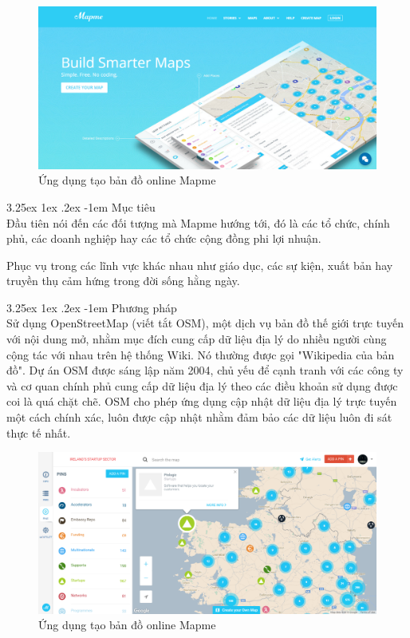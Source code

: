 \documentclass[12pt,a4paper]{article}
\makeatletter
\newcommand{\myparagraph}[1]{\paragraph{#1}\mbox{}\\} %
\renewcommand\paragraph{\@startsection{paragraph}{5}{\z@}%
  {3.25ex \@plus1ex \@minus.2ex}%
  {-1em}%
  {\normalfont\normalsize\bfseries}}
\makeatother
\begin{document}
\begin{figure}[htp]
	\begin{center}
    \includegraphics[scale=.4]{image/mapme}
    \caption{Ứng dụng tạo bản đồ online Mapme}
    \label{fig:mapme}
    \end{center}
\end{figure}

\myparagraph{Mục tiêu}
Đầu tiên nói đến các đối tượng mà Mapme hướng tới, đó là các tổ chức, chính phủ, các doanh nghiệp hay các tổ chức cộng đồng phi lợi nhuận.

Phục vụ trong các lĩnh vực khác nhau như giáo dục, các sự kiện, xuất bản hay truyền thụ cảm hứng trong đời sống hằng ngày.

\myparagraph{Phương pháp}
Sử dụng OpenStreetMap (viết tắt OSM)\cite{osm}, một dịch vụ bản đồ thế giới trực tuyến với nội dung mở, nhằm mục đích cung cấp dữ liệu địa lý do nhiều người cùng cộng tác với nhau trên hệ thống Wiki. Nó thường được gọi "Wikipedia của bản đồ". Dự án OSM được sáng lập năm 2004, chủ yếu để cạnh tranh với các công ty và cơ quan chính phủ cung cấp dữ liệu địa lý theo các điều khoản sử dụng được coi là quá chặt chẽ. OSM cho phép ứng dụng cập nhật dữ liệu địa lý trực tuyến một cách chính xác, luôn được cập nhật nhằm đảm bảo các dữ liệu luôn đi sát thực tế nhất.

\begin{figure}[htp]
	\begin{center}
    \includegraphics[scale=.4]{image/mapmeOSM}
    \caption{Ứng dụng tạo bản đồ online Mapme}
    \label{fig:mapmeOSM}
	\end{center}
\end{figure}
\end{document}
